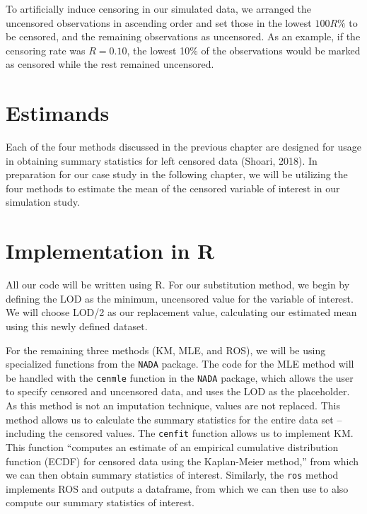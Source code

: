 \documentclass[12pt, twoside]{amherstthesis}
\begin{document}
To artificially induce censoring in our simulated data, we arranged the uncensored observations in ascending order and set those in the lowest \(100R \%\) to be censored, and the remaining observations as uncensored. As an example, if the censoring rate was \(R = 0.10\), the lowest 10\% of the observations would be marked as censored while the rest remained uncensored.

\hypertarget{estimands}{%
\section{Estimands}\label{estimands}}

Each of the four methods discussed in the previous chapter are designed for usage in obtaining summary statistics for left censored data (Shoari, 2018). In preparation for our case study in the following chapter, we will be utilizing the four methods to estimate the mean of the censored variable of interest in our simulation study.

\hypertarget{implementation}{%
\section{Implementation in R}\label{implementation}}

All our code will be written using R. For our substitution method, we begin by defining the LOD as the minimum, uncensored value for the variable of interest. We will choose LOD/2 as our replacement value, calculating our estimated mean using this newly defined dataset.

For the remaining three methods (KM, MLE, and ROS), we will be using specialized functions from the \texttt{NADA} package. The code for the MLE method will be handled with the \texttt{cenmle} function in the \texttt{NADA} package, which allows the user to specify censored and uncensored data, and uses the LOD as the placeholder. As this method is not an imputation technique, values are not replaced. This method allows us to calculate the summary statistics for the entire data set -- including the censored values. The \texttt{cenfit} function allows us to implement KM. This function ``computes an estimate of an empirical cumulative distribution function (ECDF) for censored data using the Kaplan-Meier method,'' from which we can then obtain summary statistics of interest. Similarly, the \texttt{ros} method implements ROS and outputs a dataframe, from which we can then use to also compute our summary statistics of interest.
\end{document}
